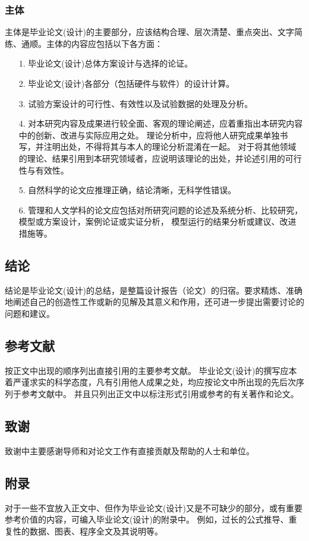     \subsubsection{主体}
        主体是毕业论文(设计)的主要部分，应该结构合理、层次清楚、重点突出、文字简练、通顺。主体的内容应包括以下各方面：
        \begin{itemize}
            \item[1.] 毕业论文(设计)总体方案设计与选择的论证。
            \item[2.] 毕业论文(设计)各部分（包括硬件与软件）的设计计算。
            \item[3.] 试验方案设计的可行性、有效性以及试验数据的处理及分析。
            \item[4.] 对本研究内容及成果进行较全面、客观的理论阐述，应着重指出本研究内容中的创新、改进与实际应用之处。
                      理论分析中，应将他人研究成果单独书写，并注明出处，不得将其与本人的理论分析混淆在一起。
                      对于将其他领域的理论、结果引用到本研究领域者，应说明该理论的出处，并论述引用的可行性与有效性。
            \item[5.] 自然科学的论文应推理正确，结论清晰，无科学性错误。
            \item[6.] 管理和人文学科的论文应包括对所研究问题的论述及系统分析、比较研究，模型或方案设计，案例论证或实证分析，
                      模型运行的结果分析或建议、改进措施等。
        \end{itemize}
    \subsection{结论}
        结论是毕业论文(设计)的总结，是整篇设计报告（论文）的归宿。要求精炼、准确地阐述自己的创造性工作或新的见解及其意义和作用，还可进一步提出需要讨论的问题和建议。
    \subsection{参考文献}
        按正文中出现的顺序列出直接引用的主要参考文献。
        毕业论文(设计)的撰写应本着严谨求实的科学态度，凡有引用他人成果之处，均应按论文中所出现的先后次序列于参考文献中。
        并且只列出正文中以标注形式引用或参考的有关著作和论文。{\bfseries{}}
    \subsection{致谢}
        致谢中主要感谢导师和对论文工作有直接贡献及帮助的人士和单位。
    \subsection{附录}
        对于一些不宜放入正文中、但作为毕业论文(设计)又是不可缺少的部分，或有重要参考价值的内容，可编入毕业论文(设计)的附录中。
        例如，过长的公式推导、重复性的数据、图表、程序全文及其说明等。


